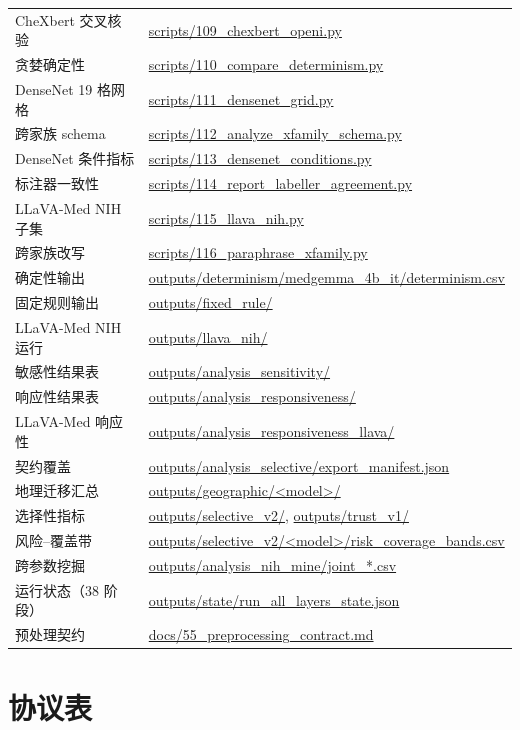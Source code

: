 \begin{table}[H]
\begin{tabular}{ll}
CheXbert 交叉核验 & \url{scripts/109_chexbert_openi.py} \\
贪婪确定性 & \url{scripts/110_compare_determinism.py} \\
DenseNet 19 格网格 & \url{scripts/111_densenet_grid.py} \\
跨家族 schema & \url{scripts/112_analyze_xfamily_schema.py} \\
DenseNet 条件指标 & \url{scripts/113_densenet_conditions.py} \\
标注器一致性 & \url{scripts/114_report_labeller_agreement.py} \\
LLaVA-Med NIH 子集 & \url{scripts/115_llava_nih.py} \\
跨家族改写 & \url{scripts/116_paraphrase_xfamily.py} \\
确定性输出 & \url{outputs/determinism/medgemma_4b_it/determinism.csv} \\
固定规则输出 & \url{outputs/fixed_rule/} \\
LLaVA-Med NIH 运行 & \url{outputs/llava_nih/} \\
敏感性结果表 & \url{outputs/analysis_sensitivity/} \\
响应性结果表 & \url{outputs/analysis_responsiveness/} \\
LLaVA-Med 响应性 & \url{outputs/analysis_responsiveness_llava/} \\
契约覆盖 & \url{outputs/analysis_selective/export_manifest.json} \\
地理迁移汇总 & \url{outputs/geographic/<model>/} \\
选择性指标 & \url{outputs/selective_v2/}, \url{outputs/trust_v1/} \\
风险--覆盖带 & \url{outputs/selective_v2/<model>/risk_coverage_bands.csv} \\
跨参数挖掘 & \url{outputs/analysis_nih_mine/joint_*.csv} \\
运行状态（38 阶段） & \url{outputs/state/run_all_layers_state.json} \\
预处理契约 & \url{docs/55_preprocessing_contract.md} \\
\bottomrule
\end{tabular}
\end{table}

\section{协议表}
\label{app:protocol}

